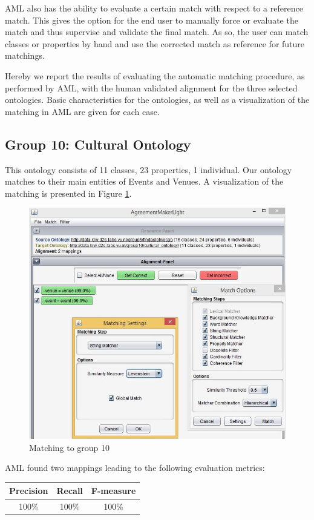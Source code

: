 \documentclass[runningheads,a4paper]{../../StyleFiles/llncs}
\begin{document}
AML also has the ability to evaluate a certain match with respect to a reference match. This gives the option for the end user to manually force or evaluate the match and thus supervise and validate the final match. As so, the user can match classes or properties by hand and use the corrected match as reference for future matchings.

Hereby we report the results of evaluating the automatic matching procedure, as performed by AML, with the human validated alignment for the three selected ontologies. Basic characteristics for the ontologies, as well as a visualization of the matching in AML are given for each case.

\subsection{Group 10: Cultural Ontology}
This ontology consists of 11 classes, 23 properties, 1 individual. Our ontology matches to their main entities of Events and Venues. A visualization of the matching is presented in Figure \ref{fig:match_g10}.

\begin{figure}[h]\centering
	\includegraphics[width=.7\textwidth]{img/match_g10.png}
	\caption{Matching to group 10}
	\label{fig:match_g10}
\end{figure}

AML found two mappings leading to the following evaluation metrics:

\begin{center}
	\begin{tabular}{| c | c | c |}
		\hline
		\textbf{Precision} & \textbf{Recall} & \textbf{F-measure} \\ \hline
		100\% & 100\% & 100\% \\ \hline
	\end{tabular}
\end{center}
\end{document}
